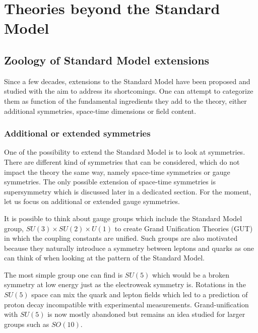     \section{Theories beyond the Standard Model \label{sec:beyondTheStandardModel}}

        \subsection{Zoology of Standard Model extensions}

        Since a few decades, extensions to the Standard Model have been proposed and
        studied with the aim to address its shortcomings. One can attempt to categorize
        them as function of the fundamental ingredients they add to the theory, either
        additional symmetries, space-time dimensions or field content.

            \subsubsection{Additional or extended symmetries}

        One of the possibility to extend the Standard Model is to look at symmetries.
        There are different kind of symmetries that can be considered, which do not impact the theory
        the same way, namely space-time symmetries or gauge symmetries. The only possible
        extension of space-time symmetries is supersymmetry which is discussed later
        in a dedicated section. For the moment, let us focus on additional or extended gauge
        symmetries.

        It is possible to think about gauge groups which include the Standard Model group,
        $SU(3) \times SU(2) \times U(1)$ to create Grand Unification Theories (GUT) in which
        the coupling constants are unified. Such groups are also motivated because they
        naturally introduce a symmetry between leptons and quarks as one can think of
        when looking at the pattern of the Standard Model.

        The most simple group one can find is $SU(5)$ \cite{SU5GUT} which would be a broken symmetry at
        low energy just as the electroweak symmetry is. Rotations in the $SU(5)$ space
        can mix the quark and lepton fields which led to a prediction of proton decay
        incompatible with experimental measurements. Grand-unification with $SU(5)$ is
        now mostly abandoned but remains an idea studied for larger groups such as $SO(10)$.

